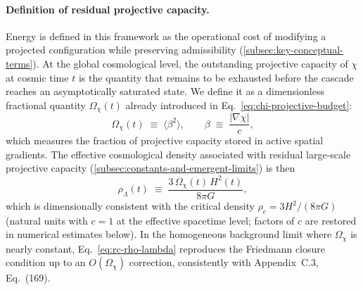     \paragraph{Definition of residual projective capacity.}
      Energy is defined in this framework as the operational cost of modifying
      a projected configuration while preserving admissibility (\ref{subsec:key-conceptual-terms}).
      At the global cosmological level, the outstanding projective capacity
      of $\chi$ at cosmic time $t$ is the quantity that remains to be
      exhausted before the cascade reaches an asymptotically saturated state.
      We define it as a dimensionless fractional quantity $\Omega_\chi(t)$
      already introduced in Eq.~\eqref{eq:chi-projective-budget}:
    \begin{equation}
      \label{eq:rc-omega}
      \Omega_\chi(t) \;\equiv\; \langle \beta^2 \rangle,
      \qquad
      \beta \;\equiv\; \frac{|\nabla\chi|}{c},
      \end{equation}
      which measures the fraction of projective capacity stored in active
      spatial gradients.
      The effective cosmological density associated with residual large-scale
      projective capacity (\ref{subsec:constants-and-emergent-limits}) is then
    \begin{equation}
      \label{eq:rc-rho-lambda}
      \rho_{\Lambda}(t)
      \;\equiv\;
      \frac{3\,\Omega_\chi(t)\,H^2(t)}{8\pi G},
      \end{equation}
      which is dimensionally consistent with the critical density
      $\rho_c = 3H^2/(8\pi G)$ (natural units with $c=1$ at the effective
      spacetime level; factors of $c$ are restored in numerical estimates
      below).
      In the homogeneous background limit where $\Omega_\chi$ is nearly
      constant, Eq.~\eqref{eq:rc-rho-lambda} reproduces the Friedmann
      closure condition up to an $O(\Omega_\chi)$ correction, consistently
      with Appendix~C.3, Eq.~(169).

